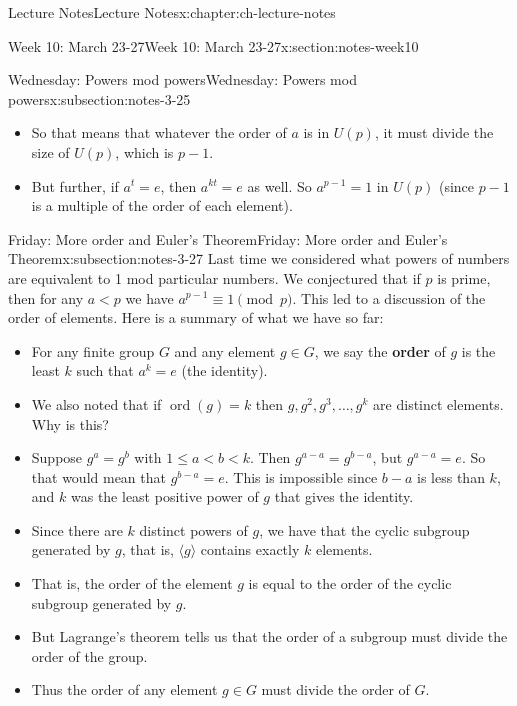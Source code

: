 \documentclass[oneside,11pt,]{book}
\newcommand{\terminology}[1]{\textbf{#1}}
\DeclareMathOperator{\ord}{ord}
\newcommand{\lt}{<}
\begin{document}
\begin{chapterptx}{Lecture Notes}{}{Lecture Notes}{}{}{x:chapter:ch-lecture-notes}
\begin{sectionptx}{Week 10: March 23-27}{}{Week 10: March 23-27}{}{}{x:section:notes-week10}
\begin{subsectionptx}{Wednesday: Powers mod powers}{}{Wednesday: Powers mod powers}{}{}{x:subsection:notes-3-25}
\begin{itemize}[label=\textbullet]
\item{}So that means that whatever the order of \(a\) is in \(U(p)\), it must divide the size of \(U(p)\), which is \(p-1\).%
\item{}But further, if \(a^t = e\), then \(a^{kt} = e\) as well.  So \(a^{p-1} = 1\) in \(U(p)\) (since \(p-1\) is a multiple of the order of each element).%
\end{itemize}
%
\end{subsectionptx}
%
%
\typeout{************************************************}
\typeout{************************************************}
%
\begin{subsectionptx}{Friday: More order and Euler's Theorem}{}{Friday: More order and Euler's Theorem}{}{}{x:subsection:notes-3-27}
Last time we considered what powers of numbers are equivalent to 1 mod particular numbers.  We conjectured that if \(p\) is prime, then for any \(a \lt p\) we have \(a^{p-1} \equiv 1 \pmod{p}\).  This led to a discussion of the order of elements.  Here is a summary of what we have so far:%
\begin{itemize}[label=\textbullet]
\item{}For any finite group \(G\) and any element \(g \in G\), we say the \terminology{order} of \(g\) is the least \(k\) such that \(a^k = e\) (the identity).%
\item{}We also noted that if \(\ord(g) = k\) then \(g, g^2, g^3,\ldots, g^k\) are distinct elements.  Why is this?%
\item{}Suppose \(g^a = g^b\) with \(1 \le a \lt b \lt k\).  Then \(g^{a-a} = g^{b-a}\), but \(g^{a-a} = e\).  So that would mean that \(g^{b-a} = e\).  This is impossible since \(b-a\) is less than \(k\), and \(k\) was the least positive power of \(g\) that gives the identity.%
\item{}Since there are \(k\) distinct powers of \(g\), we have that the cyclic subgroup generated by \(g\), that is, \(\langle g \rangle\) contains exactly \(k\) elements.%
\item{}That is, the order of the element \(g\) is equal to the order of the cyclic subgroup generated by \(g\).%
\item{}But Lagrange's theorem tells us that the order of a subgroup must divide the order of the group.%
\item{}Thus the order of any element \(g \in G\) must divide the order of \(G\).%
\end{itemize}
%
\par

\end{subsectionptx}
\end{sectionptx}
\end{chapterptx}
\end{document}

